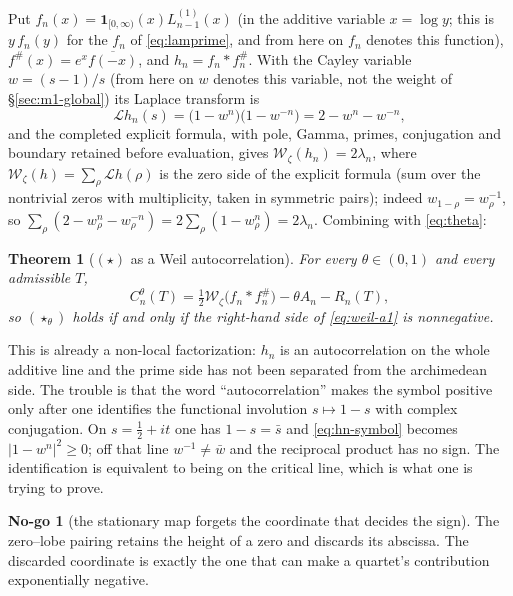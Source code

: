 \documentclass[11pt]{amsart}
\newtheorem{theorem}{Theorem}[section]
\theoremstyle{definition}
\theoremstyle{remark}
\theoremstyle{definition}
\newtheorem{nogo}{No-go}[section]
\newcommand{\half}{\tfrac{1}{2}}
\begin{document}
Put $f_n(x)=\mathbf1_{[0,\infty)}(x)L^{(1)}_{n-1}(x)$ (in the additive variable $x=\log y$; this is $y\,f_n(y)$ for the $f_n$ of \eqref{eq:lamprime}, and from here on $f_n$ denotes this function), $f^{\#}(x)=e^x\overline{f(-x)}$, and
$h_n=f_n*f_n^{\#}$. With the Cayley variable $w=(s-1)/s$ (from here on $w$ denotes this variable,
not the weight of \S\ref{sec:m1-global}) its Laplace transform is
\begin{equation}\label{eq:hn-symbol}
   \mathcal Lh_n(s)=\bigl(1-w^n\bigr)\bigl(1-w^{-n}\bigr)=2-w^n-w^{-n},
\end{equation}
and the completed explicit formula, with pole, Gamma, primes, conjugation and boundary retained
before evaluation, gives $\mathcal W_\zeta(h_n)=2\lambda_n$, where
$\mathcal W_\zeta(h)=\sum_\rho\mathcal Lh(\rho)$ is the zero side of the explicit formula (sum over
the nontrivial zeros with multiplicity, taken in symmetric pairs); indeed
$w_{1-\rho}=w_\rho^{-1}$, so $\sum_\rho(2-w_\rho^n-w_\rho^{-n})=2\sum_\rho(1-w_\rho^n)=2\lambda_n$.
Combining with \eqref{eq:theta}:

\begin{theorem}[$(\star)$ as a Weil autocorrelation]\label{thm:weil-a1}
For every $\theta\in(0,1)$ and every admissible $T$,
\begin{equation}\label{eq:weil-a1}
   C_n^\theta(T)=\tfrac12\mathcal W_\zeta\bigl(f_n*f_n^{\#}\bigr)-\theta A_n-R_n(T),
\end{equation}
so $(\star_\theta)$ holds if and only if the right-hand side of \eqref{eq:weil-a1} is
nonnegative.
\end{theorem}

This is already a non-local factorization: $h_n$ is an autocorrelation on the whole additive
line and the prime side has not been separated from the archimedean side. The trouble is that
the word ``autocorrelation'' makes the symbol positive only after one identifies the functional
involution $s\mapsto1-s$ with complex conjugation. On $s=\half+it$ one has $1-s=\bar s$ and
\eqref{eq:hn-symbol} becomes $|1-w^n|^2\ge0$; off that line $w^{-1}\ne\bar w$ and the reciprocal
product has no sign. The identification is equivalent to being on the critical line, which is
what one is trying to prove.

\begin{nogo}[the stationary map forgets the coordinate that decides the sign]\label{ng:m3}
The zero--lobe pairing retains the height of a zero and discards its abscissa. The discarded
coordinate is exactly the one that can make a quartet's contribution exponentially negative.
\end{nogo}
\end{document}
